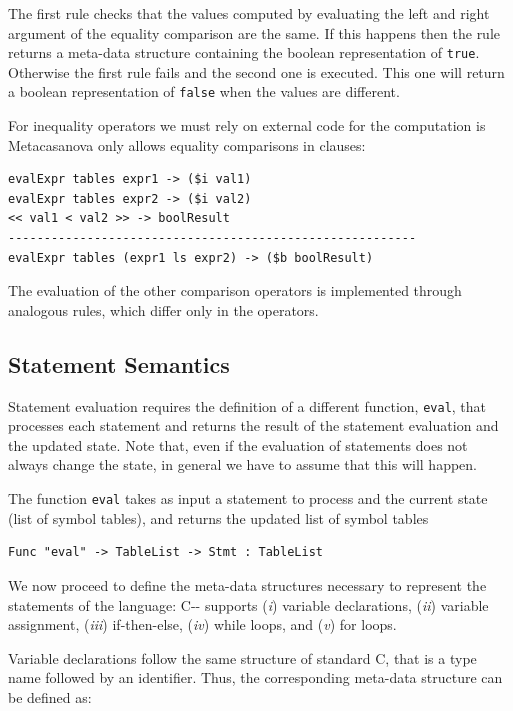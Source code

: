 \noindent
The first rule checks that the values computed by evaluating the left and right argument of the equality comparison are the same. If this happens then the rule returns a meta-data structure containing the boolean representation of \texttt{true}. Otherwise the first rule fails and the second one is executed. This one will return a boolean representation of \texttt{false} when the values are different.

For inequality operators we must rely on external code for the computation is Metacasanova only allows equality comparisons in clauses:

\begin{lstlisting}
evalExpr tables expr1 -> ($i val1)
evalExpr tables expr2 -> ($i val2)
<< val1 < val2 >> -> boolResult
---------------------------------------------------------
evalExpr tables (expr1 ls expr2) -> ($b boolResult)
\end{lstlisting}

\noindent
The evaluation of the other comparison operators is implemented through analogous rules, which differ only in the operators.

\subsection{Statement Semantics}

Statement evaluation requires the definition of a different function, \texttt{eval}, that processes each statement and returns the result of the statement evaluation and the updated state. Note that, even if the evaluation of statements does not always change the state, in general we have to assume that this will happen.

The function \texttt{eval} takes as input a statement to process and the current state (list of symbol tables), and returns the updated list of symbol tables

\begin{lstlisting}
Func "eval" -> TableList -> Stmt : TableList
\end{lstlisting}

We now proceed to define the meta-data structures necessary to represent the statements of the language: C-{}- supports (\textit{i}) variable declarations, (\textit{ii}) variable assignment, (\textit{iii}) if-then-else, (\textit{iv}) while loops, and (\textit{v}) for loops.

Variable declarations follow the same structure of standard C, that is a type name followed by an identifier. Thus, the corresponding meta-data structure can be defined as:

